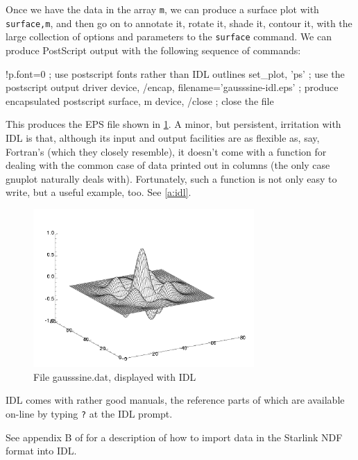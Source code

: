 \documentclass[11pt,oneside,chapters]{starlink}
\begin{document}
Once we have the data in the array \texttt{m}, we can
produce a surface plot with \texttt{surface,m}, and
then go on to annotate it, rotate it, shade it, contour
it, with the large collection of options and parameters to
the \texttt{surface} command.  We can produce
PostScript output with the following sequence of commands:

\begin{terminalv}
  !p.font=0             ; use postscript fonts rather than IDL outlines
  set_plot, 'ps'        ; use the postscript output driver
  device, /encap, filename='gausssine-idl.eps'
                        ; produce encapsulated postscript
  surface, m
  device, /close        ; close the file
\end{terminalv}

This produces the EPS file shown in \ref{f:gausssine:i}.
A minor, but persistent, irritation
with IDL is that, although its input and output facilities
are as flexible as, say, Fortran's (which they closely
resemble), it doesn't come with a function for dealing
with the common case of data printed out in columns (the
only case gnuplot naturally deals with).  Fortunately,
such a function is not only easy to write, but a useful
example, too.  See \ref{a:idl}.

\begin{figure}
\center
\includegraphics[width=0.75\textwidth]{sc13-gausssine-idl}
\caption{File gausssine.dat, displayed with
IDL}
\label{f:gausssine:i}
\end{figure}

IDL comes with rather good manuals, the reference parts
of which are available on-line by typing \texttt{?} at
the IDL prompt.

See appendix B of
for a description of how to import data in the Starlink
NDF format into IDL.
\end{document}
